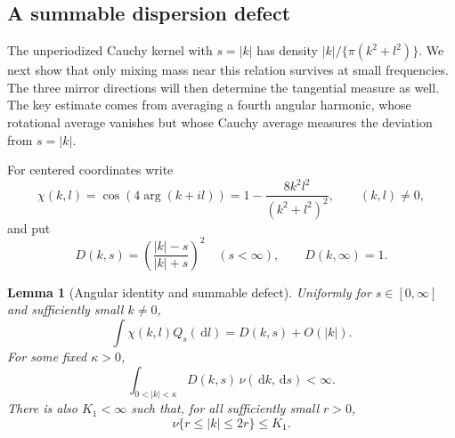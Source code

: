 \documentclass[11pt]{article}
\newtheorem{lemma}[theorem]{Lemma}
\theoremstyle{definition}
\theoremstyle{remark}
\numberwithin{equation}{section}
\begin{document}
\subsection{A summable dispersion defect}

The unperiodized Cauchy kernel with $s=|k|$ has density
$|k|/\{\pi(k^2+l^2)\}$.  We next show that only mixing mass near this
relation survives at small frequencies.  The three mirror directions
will then determine the tangential measure as well.  The key estimate
comes from averaging a fourth angular harmonic, whose rotational average
vanishes but whose Cauchy average measures the deviation from $s=|k|$.

For centered coordinates write
\[
 \chi(k,l)=\cos(4\arg(k+il))
   =1-\frac{8k^2l^2}{(k^2+l^2)^2},\qquad (k,l)\ne0,
\]
and put
\[
 D(k,s)=\left(\frac{|k|-s}{|k|+s}\right)^2\quad(s<\infty),
 \qquad D(k,\infty)=1.
\]

\begin{lemma}[Angular identity and summable defect]
\label{plane:lem:defect}
Uniformly for $s\in[0,\infty]$ and sufficiently small $k\ne0$,
\begin{equation}
 \label{plane:eq:poisson}
 \int\chi(k,l)Q_s(\,\mathrm d l)=D(k,s)+O(|k|).
\end{equation}
For some fixed $\kappa>0$,
\begin{equation}
 \label{plane:eq:defect}
 \int_{0<|k|<\kappa}D(k,s)\,\nu(\,\mathrm d k,\,\mathrm d s)<\infty.
\end{equation}
There is also $K_1<\infty$ such that, for all sufficiently small $r>0$,
\begin{equation}
 \label{plane:eq:bands}
 \nu\{r\le|k|\le2r\}\le K_1.
\end{equation}
\end{lemma}
\end{document}
